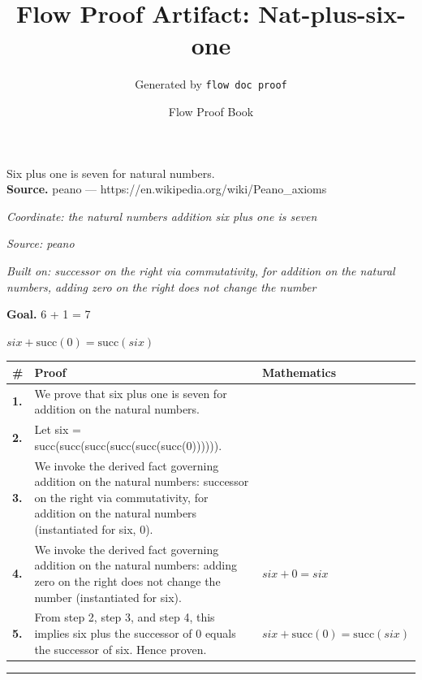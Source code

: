 \documentclass[11pt]{article}
\title{Flow Proof Artifact: Nat-plus-six-one}
\author{Generated by \texttt{flow doc proof}}
\date{Flow Proof Book}
\theoremstyle{definition}
\begin{document}
\maketitle
Six plus one is seven for natural numbers.\\[0.5em]
\textbf{Source.} peano — https://en.wikipedia.org/wiki/Peano\_axioms\\[0.5em]
\bigskip
{}\par
\smallskip\noindent\textit{Coordinate: the natural numbers \cdot addition \cdot six plus one is seven}\par
\smallskip\noindent\textit{Source: peano}\par
\smallskip\noindent\textit{Built on: successor on the right via commutativity, for addition on the natural numbers, adding zero on the right does not change the number}\par
\medskip
\noindent\textbf{Goal.} 6 + 1 = 7\par
\noindent$\displaystyle six + \mathrm{succ}(0) = \mathrm{succ}(six)$\par
\medskip
\noindent
\begin{tabular}{@{} >{\raggedright\arraybackslash}p{} >{\raggedright\arraybackslash}p{} >{\raggedleft\arraybackslash}p{} @{}}
\textbf{\#} & \textbf{Proof} & \textbf{Mathematics} \\
\midrule
\textbf{1.} & We prove that six plus one is seven for addition on the natural numbers. & \\[0.45em]
\textbf{2.} & Let six = succ(succ(succ(succ(succ(succ(0)))))). & \\[0.45em]
\textbf{3.} & We invoke the derived fact governing addition on the natural numbers: successor on the right via commutativity, for addition on the natural numbers (instantiated for six, 0). & \\[0.45em]
\textbf{4.} & We invoke the derived fact governing addition on the natural numbers: adding zero on the right does not change the number (instantiated for six). & $\displaystyle six + 0 = six$ \\[0.45em]
\textbf{5.} & From step 2, step 3, and step 4, this implies six plus the successor of 0 equals the successor of six. Hence proven. & $\displaystyle six + \mathrm{succ}(0) = \mathrm{succ}(six)$ \\[0.45em]
\bottomrule
\end{tabular}
\label{thm:Nat-addition-six_plus_one_is_seven}
\par\medskip\hrule
\end{document}
